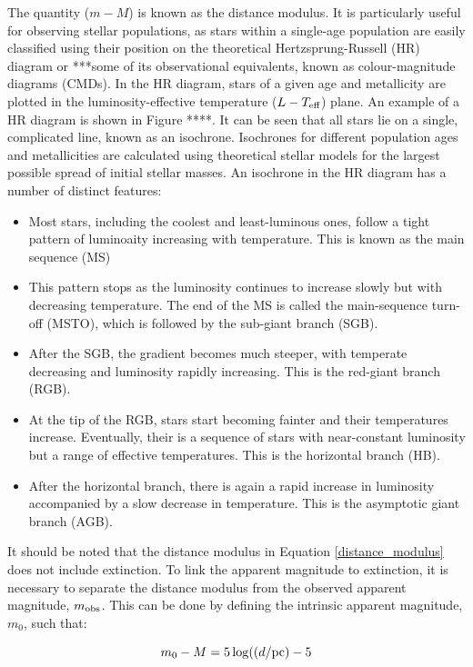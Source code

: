 \documentclass[12pt, a4paper]{report}
\begin{document}
The quantity ($m - M$) is known as the distance modulus. It is particularly useful for observing stellar populations, as stars within a single-age population are easily classified using their position on the theoretical Hertzsprung-Russell (HR) diagram or ***some of its observational equivalents, known as colour-magnitude diagrams (CMDs). In the HR diagram, stars of a given age and metallicity are plotted in the luminosity-effective temperature ($L-T_{\textnormal{eff}}$) plane. An example of a HR diagram is shown in Figure ****. It can be seen that all stars lie on a single, complicated line, known as an isochrone. Isochrones for different population ages and metallicities are calculated using theoretical stellar models for the largest possible spread of initial stellar masses. An isochrone in the HR diagram has a number of distinct features:
\begin{itemize}
\item Most stars, including the coolest and least-luminous ones, follow a tight pattern of luminoaity increasing with temperature. This is known as the main sequence (MS)
\item This pattern stops as the luminosity continues to increase slowly but with decreasing temperature. The end of the MS is called the main-sequence turn-off (MSTO), which is followed by the sub-giant branch (SGB).
\item After the SGB, the gradient becomes much steeper, with temperate decreasing and luminosity rapidly increasing. This is the red-giant branch (RGB).
\item At the tip of the RGB, stars start becoming fainter and their temperatures increase. Eventually, their is a sequence of stars with near-constant luminosity but a range of effective temperatures. This is the horizontal branch (HB).
\item After the horizontal branch, there is again a rapid increase in luminosity accompanied by a slow decrease in temperature. This is the asymptotic giant branch (AGB).
\end{itemize}

It should be noted that the distance modulus in Equation \ref{distance_modulus} does not include extinction. To link the apparent magnitude to extinction, it is necessary to separate the distance modulus from the observed apparent magnitude, $m_{\textnormal{obs}}$. This can be done by defining the intrinsic apparent magnitude, $m_{0}$, such that:

\begin{equation}
\label{intrinsic_app_mag}
m_{0} - M = 5\log( (d/\textnormal{pc}) - 5
\end{equation}
\end{document}
